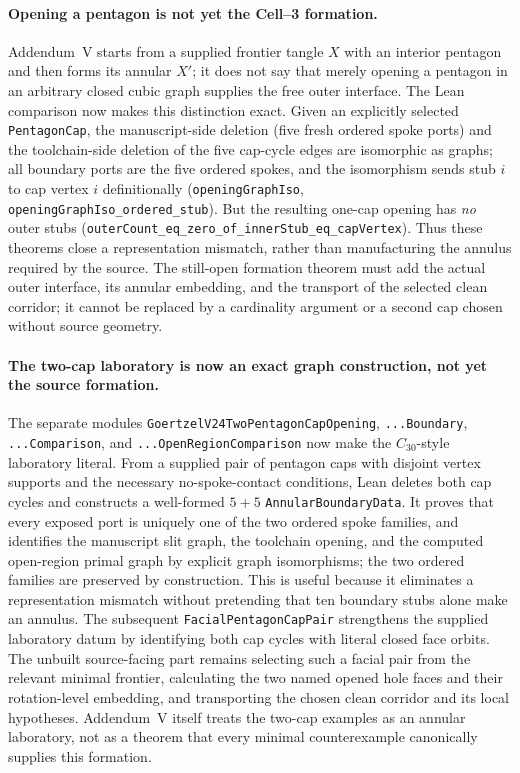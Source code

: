 \documentclass[11pt]{article}
\theoremstyle{definition}
\begin{document}
\paragraph{Opening a pentagon is not yet the Cell--3 formation.} Addendum~V
starts from a supplied frontier tangle $X$ with an interior pentagon and then
forms its annular $X'$; it does not say that merely opening a pentagon in an
arbitrary closed cubic graph supplies the free outer interface.  The Lean
comparison now makes this distinction exact.  Given an explicitly selected
\texttt{PentagonCap}, the manuscript-side deletion (five fresh ordered spoke
ports) and the toolchain-side deletion of the five cap-cycle edges are
isomorphic as graphs; all boundary ports are the five ordered spokes, and the
isomorphism sends stub $i$ to cap vertex $i$ definitionally
(\texttt{openingGraphIso},
\texttt{openingGraphIso\_ordered\_stub}).  But the resulting one-cap opening
has \emph{no} outer stubs
(\texttt{outerCount\_eq\_zero\_of\_innerStub\_eq\_capVertex}).  Thus these
theorems close a representation mismatch, rather than manufacturing the
annulus required by the source.  The still-open formation theorem must add the
actual outer interface, its annular embedding, and the transport of the
selected clean corridor; it cannot be replaced by a cardinality argument or a
second cap chosen without source geometry.

\paragraph{The two-cap laboratory is now an exact graph construction, not
yet the source formation.}  The separate modules
\texttt{GoertzelV24TwoPentagonCapOpening},
\texttt{...Boundary}, \texttt{...Comparison}, and
\texttt{...OpenRegionComparison} now make the $C_{30}$-style laboratory
literal.  From a supplied pair of pentagon caps with disjoint vertex supports
and the necessary no-spoke-contact conditions, Lean deletes both cap cycles
and constructs a well-formed $5{+}5$ \texttt{AnnularBoundaryData}.  It proves
that every exposed port is uniquely one of the two ordered spoke families,
and identifies the manuscript slit graph, the toolchain opening, and the
computed open-region primal graph by explicit graph isomorphisms; the two
ordered families are preserved by construction.  This is useful because it
eliminates a representation mismatch without pretending that ten boundary
stubs alone make an annulus.  The subsequent
\texttt{FacialPentagonCapPair} strengthens the supplied laboratory datum by
identifying both cap cycles with literal closed face orbits.  The unbuilt
source-facing part remains selecting such a facial pair from the relevant
minimal frontier, calculating the two named opened hole faces and their
rotation-level embedding, and transporting the chosen clean corridor and its
local hypotheses.  Addendum~V itself treats the two-cap
examples as an annular laboratory, not as a theorem that every minimal
counterexample canonically supplies this formation.
\end{document}
